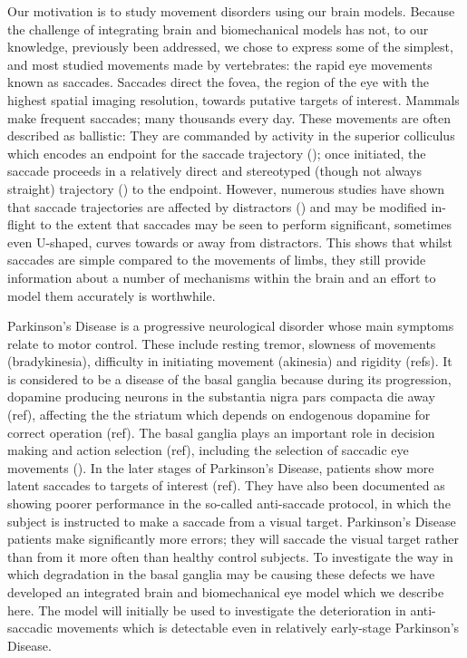 \documentclass{frontiersSCNS}
\begin{document}
Our motivation is to study movement disorders using our brain
models. Because the challenge of integrating brain and biomechanical
models has not, to our knowledge, previously been addressed, we chose
to express some of the simplest, and most studied movements made by
vertebrates: the rapid eye movements known as saccades. Saccades
direct the fovea, the region of the eye with the highest spatial
imaging resolution, towards putative targets of interest. Mammals make
frequent saccades; many thousands every day. These movements are often
described as ballistic: They are commanded by activity in the superior
colliculus which encodes an endpoint for the saccade trajectory
(\cite{wurtz_superior_1971,hepp_monkey_1993}); once initiated, the
saccade proceeds in a relatively direct and stereotyped (though not
always straight) trajectory (\cite{van_der_stigchel_eye_2006}) to
the endpoint.
However, numerous studies have shown that saccade trajectories are
affected by distractors (\cite{mcpeek_competition_2003,
port_sequential_2003, van_der_stigchel_recent_2010}) and may be
modified in-flight to the extent that saccades may be seen to perform
significant, sometimes even U-shaped, curves towards or away from
distractors. This shows that whilst saccades are simple compared to
the movements of limbs, they still provide information about a number
of mechanisms within the brain and an effort to model them accurately
is worthwhile.

Parkinson's Disease is a progressive neurological disorder whose main
symptoms relate to motor control. These include resting tremor,
slowness of movements (bradykinesia), difficulty in initiating
movement (akinesia) and rigidity (refs). It is considered to be a
disease of the basal ganglia because during its progression, dopamine
producing neurons in the substantia nigra pars compacta die away
(ref), affecting the the striatum which depends on endogenous dopamine
for correct operation (ref). The basal ganglia plays an important role
in decision making and action selection (ref), including the selection
of saccadic eye movements (\cite{hikosaka_role_2000}). In the later
stages of Parkinson's Disease, patients show more latent saccades to
targets of interest (ref). They have also been documented as showing
poorer performance in the so-called anti-saccade protocol, in which
the subject is instructed to make a saccade  from a visual
target. Parkinson's Disease patients make significantly more errors;
they will saccade  the visual target rather than  from
it more often than healthy control subjects. To investigate the way in
which degradation in the basal ganglia may be causing these defects we
have developed an integrated brain and biomechanical eye model which
we describe here. The model will initially be used to investigate the
deterioration in anti-saccadic movements which is detectable even in
relatively early-stage Parkinson's Disease.
\end{document}

